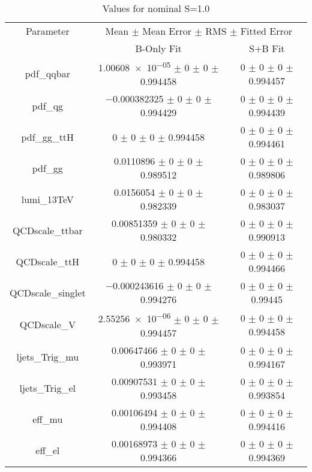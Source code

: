 \begin{table}
\centering
\caption{Values for nominal S=1.0}
\begin{tabular}{ccc}
\toprule
Parameter & \multicolumn{2}{c}{Mean $\pm$ Mean Error $\pm$ RMS $\pm$ Fitted Error}\\
 & B-Only Fit & S+B Fit\\
\midrule
pdf\_qqbar & \num{1.00608e-05} $\pm$ \num{0} $\pm$ \num{0} $\pm$ \num{0.994458} & \num{0} $\pm$ \num{0} $\pm$ \num{0} $\pm$ \num{0.994457}\\
pdf\_qg & \num{-0.000382325} $\pm$ \num{0} $\pm$ \num{0} $\pm$ \num{0.994429} & \num{0} $\pm$ \num{0} $\pm$ \num{0} $\pm$ \num{0.994439}\\
pdf\_gg\_ttH & \num{0} $\pm$ \num{0} $\pm$ \num{0} $\pm$ \num{0.994458} & \num{0} $\pm$ \num{0} $\pm$ \num{0} $\pm$ \num{0.994461}\\
pdf\_gg & \num{0.0110896} $\pm$ \num{0} $\pm$ \num{0} $\pm$ \num{0.989512} & \num{0} $\pm$ \num{0} $\pm$ \num{0} $\pm$ \num{0.989806}\\
lumi\_13TeV & \num{0.0156054} $\pm$ \num{0} $\pm$ \num{0} $\pm$ \num{0.982339} & \num{0} $\pm$ \num{0} $\pm$ \num{0} $\pm$ \num{0.983037}\\
QCDscale\_ttbar & \num{0.00851359} $\pm$ \num{0} $\pm$ \num{0} $\pm$ \num{0.980332} & \num{0} $\pm$ \num{0} $\pm$ \num{0} $\pm$ \num{0.990913}\\
QCDscale\_ttH & \num{0} $\pm$ \num{0} $\pm$ \num{0} $\pm$ \num{0.994458} & \num{0} $\pm$ \num{0} $\pm$ \num{0} $\pm$ \num{0.994466}\\
QCDscale\_singlet & \num{-0.000243616} $\pm$ \num{0} $\pm$ \num{0} $\pm$ \num{0.994276} & \num{0} $\pm$ \num{0} $\pm$ \num{0} $\pm$ \num{0.99445}\\
QCDscale\_V & \num{2.55256e-06} $\pm$ \num{0} $\pm$ \num{0} $\pm$ \num{0.994457} & \num{0} $\pm$ \num{0} $\pm$ \num{0} $\pm$ \num{0.994458}\\
ljets\_Trig\_mu & \num{0.00647466} $\pm$ \num{0} $\pm$ \num{0} $\pm$ \num{0.993971} & \num{0} $\pm$ \num{0} $\pm$ \num{0} $\pm$ \num{0.994167}\\
ljets\_Trig\_el & \num{0.00907531} $\pm$ \num{0} $\pm$ \num{0} $\pm$ \num{0.993458} & \num{0} $\pm$ \num{0} $\pm$ \num{0} $\pm$ \num{0.993854}\\
eff\_mu & \num{0.00106494} $\pm$ \num{0} $\pm$ \num{0} $\pm$ \num{0.994408} & \num{0} $\pm$ \num{0} $\pm$ \num{0} $\pm$ \num{0.994416}\\
eff\_el & \num{0.00168973} $\pm$ \num{0} $\pm$ \num{0} $\pm$ \num{0.994366} & \num{0} $\pm$ \num{0} $\pm$ \num{0} $\pm$ \num{0.994369}\\

\end{tabular}
\end{table}
